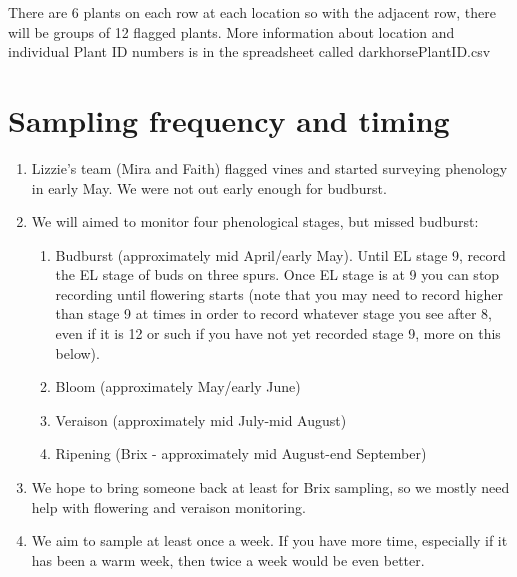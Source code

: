 \documentclass[11pt,letter]{article}
\begin{document}
There are 6 plants on each row at each location so with the adjacent row, there will be groups of 12 flagged plants. More information about location and individual Plant ID numbers is in the spreadsheet called darkhorsePlantID.csv

\section{Sampling frequency and timing}
\begin{enumerate}
  \item Lizzie's team (Mira and Faith) flagged vines and started surveying phenology in early May. We were not out early enough for budburst. 
  \item We will aimed to monitor four phenological stages, but missed budburst:
  \begin{enumerate}
	\item Budburst (approximately mid April/early May). Until EL stage 9, record the EL stage of buds on three spurs. Once EL stage is at 9 you can stop recording until flowering starts (note that you may need to record higher than stage 9 at times in order to record whatever stage you see after 8, even if it is 12 or such if you have not yet recorded stage 9, more on this below).
	\item Bloom (approximately May/early June)
  	\item Veraison (approximately mid July-mid August)
  	\item Ripening (Brix - approximately mid August-end September)
  \end{enumerate}
  \item We hope to bring someone back at least for Brix sampling, so we mostly need help with flowering and veraison monitoring. 
  \item We aim to sample at least once a week. If you have more time, especially if it has been a warm week, then twice a week would be even better.

\end{enumerate}
\end{document}

